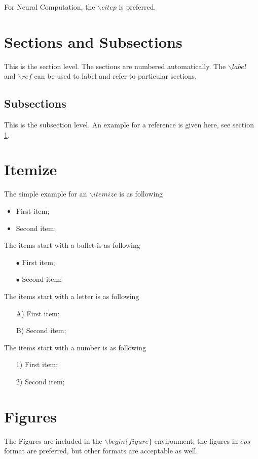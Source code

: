 \documentclass[12pt]{article}
\begin{document}
For Neural Computation, the $\backslash citep$ is preferred.

\section{Sections and Subsections}
\label{sec:1}
This is the section level. The sections are numbered automatically. The $\backslash label$ and $\backslash ref$ can be used to label and refer to particular sections.

\subsection{Subsections}
This is the subsection level. An example for a reference is given here, see section \ref{sec:1}.

\section{Itemize}
The simple example for an $\backslash itemize$ is as following
\begin{itemize}
\item First item;
\item Second item;
\end{itemize}

The items start with a bullet is as following
\begin{itemize}
\item[$\bullet$] First item;
\item[$\bullet$] Second item;
\end{itemize}

The items start with a letter is as following
\begin{itemize}
\item[A)] First item;
\item[B)] Second item;
\end{itemize}

The items start with a number is as following
\begin{itemize}
\item[1)] First item;
\item[2)] Second item;
\end{itemize}

\section{Figures}
The Figures are included in the $\backslash begin\{figure\}$ environment, the figures in $eps$ format are preferred, but other formats are acceptable as well.
\end{document}
